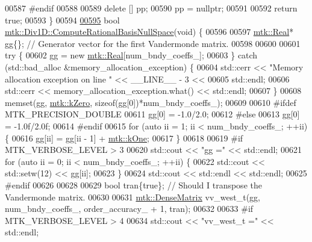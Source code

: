 \begin{DoxyCode}
{{00587 \textcolor{preprocessor}{  #endif}
00588 
00589   \textcolor{keyword}{delete} [] pp;
00590   pp = \textcolor{keyword}{nullptr};
00591 
00592   \textcolor{keywordflow}{return} \textcolor{keyword}{true};
00593 \}
00594 
\hypertarget{mtk__div__1d_8cc_source_l00595}{}\hyperlink{classmtk_1_1Div1D_aa0c0c278b2c00a29c1ceaa70d31aebab}{00595} \textcolor{keywordtype}{bool} \hyperlink{classmtk_1_1Div1D_aa0c0c278b2c00a29c1ceaa70d31aebab}{mtk::Div1D::ComputeRationalBasisNullSpace}(\textcolor{keywordtype}{void}) \{
00596 
00597   \hyperlink{group__c01-roots_gac080bbbf5cbb5502c9f00405f894857d}{mtk::Real}* gg\{\}; \textcolor{comment}{// Generator vector for the first Vandermonde matrix.}
00598 
00600 
00601   \textcolor{keywordflow}{try} \{
00602     gg = \textcolor{keyword}{new} \hyperlink{group__c01-roots_gac080bbbf5cbb5502c9f00405f894857d}{mtk::Real}[num\_bndy\_coeffs\_];
00603   \} \textcolor{keywordflow}{catch} (std::bad\_alloc &memory\_allocation\_exception) \{
00604     std::cerr << \textcolor{stringliteral}{"Memory allocation exception on line "} << \_\_LINE\_\_ - 3 <<
00605       std::endl;
00606     std::cerr << memory\_allocation\_exception.what() << std::endl;
00607   \}
00608   memset(gg, \hyperlink{group__c01-roots_ga59a451a5fae30d59649bcda274fea271}{mtk::kZero}, \textcolor{keyword}{sizeof}(gg[0])*num\_bndy\_coeffs\_);
00609 
00610 \textcolor{preprocessor}{  #ifdef MTK\_PRECISION\_DOUBLE}
00611   gg[0] = -1.0/2.0;
00612 \textcolor{preprocessor}{  #else}
00613   gg[0] = -1.0f/2.0f;
00614 \textcolor{preprocessor}{  #endif}
00615   \textcolor{keywordflow}{for} (\textcolor{keyword}{auto} ii = 1; ii < num\_bndy\_coeffs\_; ++ii) \{
00616     gg[ii] = gg[ii - 1] + \hyperlink{group__c01-roots_ga26407c24d43b6b95480943340d285c71}{mtk::kOne};
00617   \}
00618 
00619 \textcolor{preprocessor}{  #if MTK\_VERBOSE\_LEVEL > 3}
00620   std::cout << \textcolor{stringliteral}{"gg ="} << std::endl;
00621   \textcolor{keywordflow}{for} (\textcolor{keyword}{auto} ii = 0; ii < num\_bndy\_coeffs\_; ++ii) \{
00622     std::cout << std::setw(12) << gg[ii];
00623   \}
00624   std::cout << std::endl << std::endl;
00625 \textcolor{preprocessor}{  #endif}
00626 
00628 
00629   \textcolor{keywordtype}{bool} tran\{\textcolor{keyword}{true}\}; \textcolor{comment}{// Should I transpose the Vandermonde matrix.}
00630 
00631   \hyperlink{classmtk_1_1DenseMatrix}{mtk::DenseMatrix} vv\_west\_t(gg, num\_bndy\_coeffs\_, order\_accuracy\_ + 1, tran);
00632 
00633 \textcolor{preprocessor}{  #if MTK\_VERBOSE\_LEVEL > 4}
00634   std::cout << \textcolor{stringliteral}{"vv\_west\_t ="} << std::endl;
}}
\end{DoxyCode}
